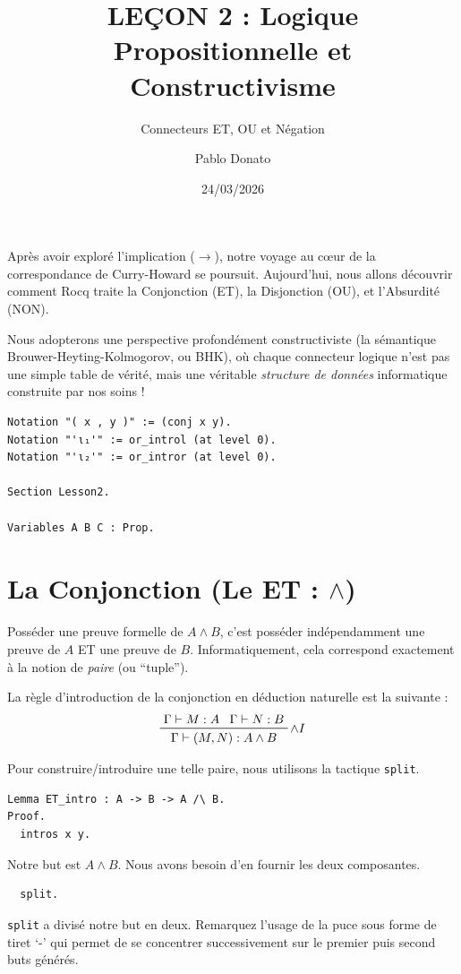 \documentclass[11pt,a4paper]{article}
\title{LEÇON 2 : Logique Propositionnelle et Constructivisme}
\subtitle{Connecteurs ET, OU et Négation}
\date{24/03/2026}
\author{Pablo Donato}
\makeatletter
\let\oldmaketitle\maketitle
\renewcommand{\maketitle}{%
  \let\oldtitle\@title
  \renewcommand{\@title}{\oldtitle\\[1em]\Large\normalfont\@subtitle}%
  \oldmaketitle
}
\makeatother
\begin{document}
\maketitle

Après avoir exploré l'implication ($\to$), notre voyage au cœur de la correspondance de Curry-Howard se poursuit. Aujourd'hui, nous allons découvrir comment Rocq traite la Conjonction (ET), la Disjonction (OU), et l'Absurdité (NON).

Nous adopterons une perspective profondément constructiviste (la sémantique Brouwer-Heyting-Kolmogorov, ou BHK), où chaque connecteur logique n'est pas une simple table de vérité, mais une véritable \textit{structure de données} informatique construite par nos soins !

\begin{lstlisting}
Notation "( x , y )" := (conj x y).
Notation "'ι₁'" := or_introl (at level 0).
Notation "'ι₂'" := or_intror (at level 0).

Section Lesson2.

Variables A B C : Prop.
\end{lstlisting}

\section{La Conjonction (Le ET : $\land$)}

Posséder une preuve formelle de $A \land B$, c'est posséder indépendamment une preuve de $A$ ET une preuve de $B$. Informatiquement, cela correspond exactement à la notion de \textit{paire} (ou ``tuple'').

La règle d'introduction de la conjonction en déduction naturelle est la suivante :
$$\prftree[r]{${\land}I$}{\Gamma \vdash M : A}{\Gamma \vdash N : B}{\Gamma \vdash (M, N) : A \land B}$$

Pour construire/introduire une telle paire, nous utilisons la tactique \texttt{split}.

\begin{lstlisting}
Lemma ET_intro : A -> B -> A /\ B.
Proof.
  intros x y.
\end{lstlisting}

Notre but est $A \land B$. Nous avons besoin d'en fournir les deux composantes.

\begin{lstlisting}
  split.
\end{lstlisting}

\texttt{split} a divisé notre but en deux. Remarquez l'usage de la puce sous forme de tiret `-' qui permet de se concentrer successivement sur le premier puis second buts générés.
\end{document}

